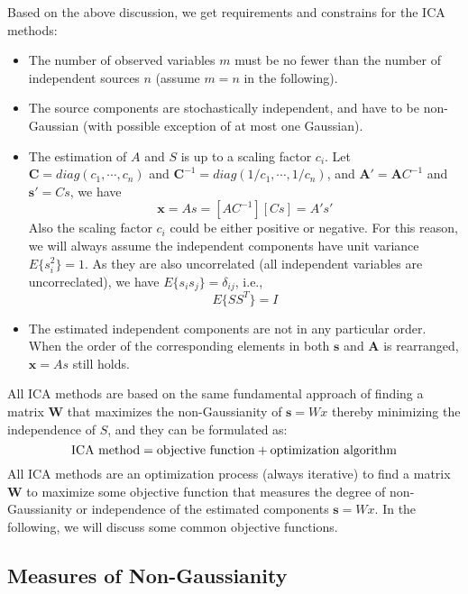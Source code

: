 Based on the above discussion, we get requirements and constrains for the
ICA methods:

\begin{itemize}
\item The number of observed variables $m$ must be no fewer than the number
	of independent sources $n$ (assume $m=n$ in the following).
\item The source components are stochastically independent, and have to be
	non-Gaussian (with possible exception of at most one Gaussian).
\item The estimation of $A$ and $S$ is up to a scaling factor $c_i$.
	Let ${\mathbf C}=diag(c_1,\cdots,c_n)$ and ${\mathbf C}^{-1}=
	diag(1/c_1,\cdots,1/c_n)$,
	and ${\mathbf A}'={\mathbf AC}^{-1}$ and ${\mathbf s'=Cs}$, we have
\[	{\mathbf x=As=[AC^{-1}][Cs]=A's'}	\]
	Also the scaling factor $c_i$ could be either positive or negative.
	For this reason, we will always assume the independent components
	have unit variance $E\{s_i^2\}=1$. As they are also uncorrelated
	(all independent variables are uncorreclated), we have
	$E\{s_is_j\}=\delta_{ij}$, i.e.,
\[	E\{SS^T\}=I	\]
\item The estimated independent components are not in any particular
	order. When the order of the corresponding elements in both
	${\mathbf s}$ and ${\mathbf A}$ is rearranged, ${\mathbf x=As}$
	still holds.
\end{itemize}

All ICA methods are based on the same fundamental approach of finding a
matrix ${\mathbf W}$ that maximizes the non-Gaussianity of ${\mathbf s=Wx}$
thereby minimizing the independence of $S$, and they can be formulated as:
\[ {\bf
\mbox{ICA method}=\mbox{objective function}+\mbox{optimization algorithm}
} \]
All ICA methods are an optimization process (always iterative) to find a
matrix ${\mathbf W}$ to maximize some objective function that measures the
degree of non-Gaussianity or independence of the estimated components
${\mathbf s=Wx}$. In the following, we will discuss some common objective
functions.

\subsection*{Measures of Non-Gaussianity}

